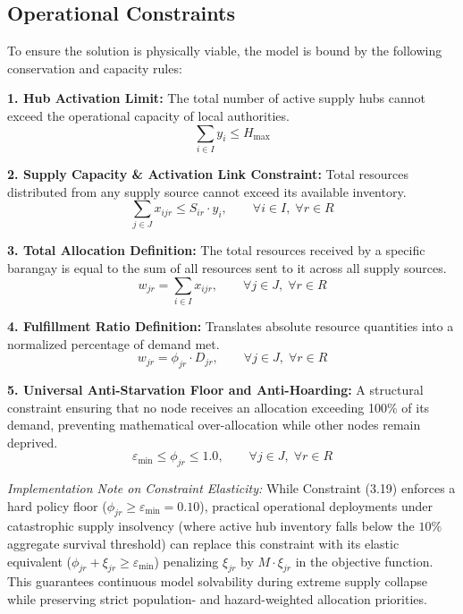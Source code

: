 \subsection{Operational Constraints}
To ensure the solution is physically viable, the model is bound by the following conservation and capacity rules:

\textbf{1. Hub Activation Limit:} The total number of active supply hubs cannot exceed the operational capacity of local authorities.
\begin{equation}
    \sum_{i \in I} y_i \le H_{\max}
    \label{eq:hub_limit}
\end{equation}

\textbf{2. Supply Capacity \& Activation Link Constraint:} Total resources distributed from any supply source cannot exceed its available inventory.
\begin{equation}
    \sum_{j \in J} x_{ijr} \le S_{ir} \cdot y_i, \qquad \forall i \in I, \; \forall r \in R
    \label{eq:supply_capacity}
\end{equation}

\textbf{3. Total Allocation Definition:} The total resources received by a specific barangay is equal to the sum of all resources sent to it across all supply sources.
\begin{equation}
    w_{jr} = \sum_{i \in I} x_{ijr}, \qquad \forall j \in J, \; \forall r \in R
    \label{eq:total_allocation}
\end{equation}

\textbf{4. Fulfillment Ratio Definition:} Translates absolute resource quantities into a normalized percentage of demand met.
\begin{equation}
    w_{jr} = \phi_{jr} \cdot D_{jr}, \qquad \forall j \in J, \; \forall r \in R
    \label{eq:fulfillment_ratio}
\end{equation}

\textbf{5. Universal Anti-Starvation Floor and Anti-Hoarding:} A structural constraint ensuring that no node receives an allocation exceeding 100\% of its demand, preventing mathematical over-allocation while other nodes remain deprived.
\begin{equation}
    \varepsilon_{\min} \le \phi_{jr} \le 1.0, \qquad \forall j \in J, \; \forall r \in R
    \label{eq:floor_ceiling_bounds}
\end{equation}

\noindent \textit{Implementation Note on Constraint Elasticity:} While Constraint (3.19) enforces a hard policy floor ($\phi_{jr} \ge \varepsilon_{\min} = 0.10$), practical operational deployments under catastrophic supply insolvency (where active hub inventory falls below the $10\%$ aggregate survival threshold) can replace this constraint with its elastic equivalent ($\phi_{jr} + \xi_{jr} \ge \varepsilon_{\min}$) penalizing $\xi_{jr}$ by $M \cdot \xi_{jr}$ in the objective function. This guarantees continuous model solvability during extreme supply collapse while preserving strict population- and hazard-weighted allocation priorities.


